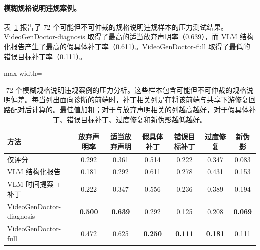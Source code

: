 \documentclass{article}
\begin{document}
\begin{table}[t]
\centering\scriptsize
\caption{72 个模糊规格说明违规案例的压力分析。这些样本包含可能但不可仲裁的规格说明偏差。每当列出面向诊断的前端时，补丁相关列是在将该前端与共享下游修复回路配对后计算的。最佳值加粗；对于与放弃声明相关的列越高越好，对于假具体补丁、错误目标补丁、过度修复和新伪影越低越好。}
\paragraph{模糊规格说明违规案例。}
表~\ref{tab:ambiguous_violation_cases} 报告了 72 个可能但不可仲裁的规格说明违规样本的压力测试结果。VideoGenDoctor-diagnosis 取得了最高的适当放弃声明率（0.639），而 VLM 结构化报告产生了最高的假具体补丁率（0.611）。VideoGenDoctor-full 取得了最低的错误目标补丁率（0.111）。

\label{tab:ambiguous_violation_cases}
\begin{adjustbox}{max width=\textwidth}
\begin{tabular}{lcccccc}
\toprule
方法 & 放弃声明率 & 适当放弃声明 & 假具体补丁 & 错误目标补丁 & 过度修复 & 新伪影 \\
\midrule
仅评分 & 0.292 & 0.361 & 0.514 & 0.222 & 0.347 & 0.083 \\
VLM 结构化报告 & 0.181 & 0.292 & 0.611 & 0.278 & 0.431 & 0.153 \\
VLM 时间提案 + 补丁 & 0.222 & 0.347 & 0.556 & 0.236 & 0.389 & 0.194 \\
VideoGenDoctor-diagnosis & \textbf{0.500} & \textbf{0.639} & 0.292 & 0.125 & 0.208 & \textbf{0.069} \\
VideoGenDoctor-full & 0.472 & 0.625 & \textbf{0.250} & \textbf{0.111} & \textbf{0.181} & 0.111 \\
\bottomrule
\end{tabular}
\end{adjustbox}
\end{table}
\end{document}
